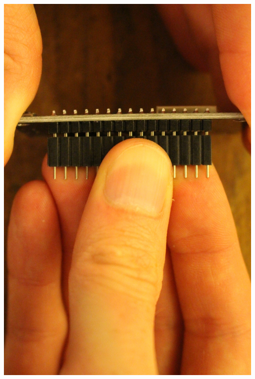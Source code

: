 \documentclass{article}
\begin{document}
\begin{minipage}[b]{0.5\textwidth}
	\includegraphics[width=\textwidth]{Bilder2019/IMG_6456.JPG}
\end{minipage}
\end{document}
